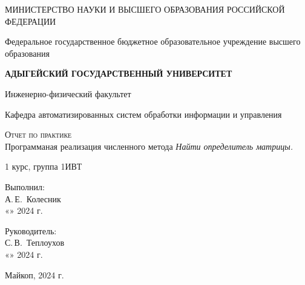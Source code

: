 \documentclass[12pt,a4paper]{scrartcl}
\begin{document}
\begin{titlepage}
		\begin{center}
			\large
			МИНИСТЕРСТВО НАУКИ И ВЫСШЕГО ОБРАЗОВАНИЯ РОССИЙСКОЙ ФЕДЕРАЦИИ
			
			Федеральное государственное бюджетное образовательное учреждение высшего образования
			
			\textbf{АДЫГЕЙСКИЙ ГОСУДАРСТВЕННЫЙ УНИВЕРСИТЕТ}
			\vspace{0.25cm}
			
			Инженерно-физический факультет
			
			Кафедра автоматизированных систем обработки информации и управления
			\vfill

			\vfill
			
			\textsc{Отчет по практике}\\[5mm]
			
			{\LARGE Программаная реализация численного метода \textit{Найти определитель матрицы.}}
			\bigskip
			
			1 курс, группа 1ИВТ
		\end{center}
		\vfill
		
		\newlength{\ML}
		\hfill\begin{minipage}{0.5\textwidth}
			Выполнил:\\
			\underline{\hspace{\ML}} А.\,Е.~Колесник\\
			«\underline{\hspace{0.7cm}}» \underline{\hspace{2cm}} 2024 г.
		\end{minipage}%
		\bigskip
		
		\hfill\begin{minipage}{0.5\textwidth}
			Руководитель:\\
			\underline{\hspace{\ML}} С.\,В.~Теплоухов\\
			«\underline{\hspace{0.7cm}}» \underline{\hspace{2cm}} 2024 г.
		\end{minipage}%
		\vfill
		
		\begin{center}
			Майкоп, 2024 г.
		\end{center}
	\end{titlepage}
 
\end{document}
